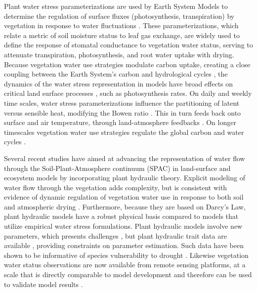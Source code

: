 \documentclass[draft,linenumbers]{agujournal}
\begin{document}
Plant water stress parameterizations are used by Earth System Models to determine the regulation of surface fluxes (photosynthesis, transpiration) by vegetation in response to water fluctuations \citep{egea2011,verhoef2014}.
These parameterizations, which relate a metric of soil moisture status to leaf gas exchange, are widely used to define the response of stomatal conductance to vegetation water status, serving to attenuate transpiration, photosynthesis, and root water uptake with drying.
Because vegetation water use strategies modulate carbon uptake, creating a close coupling between the Earth System's carbon and hydrological cycles \citep{green2017}, the dynamics of the water stress representation in models have broad effects on critical land surface processes \citep{joetzjer2014}, such as photosynthesis rates.
On daily and weekly time scales, water stress parameterizations influence the partitioning of latent versus sensible heat, modifying the Bowen ratio \citep{gentine2007,gentine2011}. 
This in turn feeds back onto surface and air temperature, through land-atmosphere feedbacks \citep{bonan2008,seneviratne2006}.
On longer timescales vegetation water use strategies regulate the global carbon and water cycles \citep{dekauwe2015}.

Several recent studies have aimed at advancing the representation of water flow through the Soil-Plant-Atmosphere continuum (SPAC) in land-surface and ecosystem models \citep{xu2016,christoffersen2016,sperry2017} by incorporating plant hydraulic theory.  
Explicit modeling of water flow through the vegetation adds complexity, but is consistent with evidence of dynamic regulation of vegetation water use in response to both soil and atmospheric drying \citep{tardieu1998,sperry1998,sperry2015}.
Furthermore, because they are based on Darcy's Law, plant hydraulic models have a robust physical basis compared to models that utilize empirical water stress formulations.
Plant hydraulic models involve new parameters, which presents challenges \citep{drake2017}, but plant hydraulic trait data are available \citep{kattge2011,anderegg2015a}, providing constraints on parameter estimation.   
Such data have been shown to be informative of species vulnerability to drought \citep{choat2012}.
Likewise vegetation water status observations are now available from remote sensing platforms, at a scale that is directly comparable to model development \citep{konings2016,grant2016} and therefore can be used to validate model results \citep{momen2017,konings2017b}.
\end{document}
